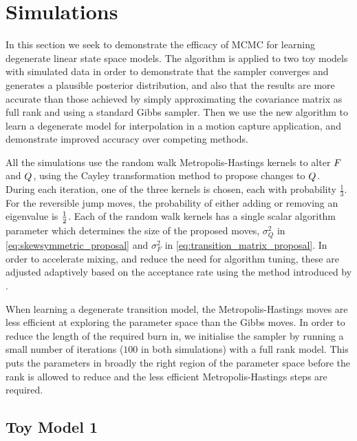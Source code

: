 \documentclass[journal,10pt]{IEEEtran}
\begin{document}
\section{Simulations} \label{sec:simulations}

In this section we seek to demonstrate the efficacy of MCMC for learning degenerate linear state space models. The algorithm is applied to two toy models with simulated data in order to demonstrate that the sampler converges and generates a plausible posterior distribution, and also that the results are more accurate than those achieved by simply approximating the covariance matrix as full rank and using a standard Gibbs sampler. Then we use the new algorithm to learn a degenerate model for interpolation in a motion capture application, and demonstrate improved accuracy over competing methods.

All the simulations use the random walk Metropolis-Hastings kernels to alter $F_{}$ and $Q_{}$, using the Cayley transformation method to propose changes to $Q_{}$. During each iteration, one of the three kernels is chosen, each with probability $\frac{1}{3}$. For the reversible jump moves, the probability of either adding or removing an eigenvalue is $\frac{1}{2}$. Each of the random walk kernels has a single scalar algorithm parameter which determines the size of the proposed moves, $\sigma_Q^2$ in \eqref{eq:skewsymmetric_proposal} and $\sigma_F^2$ in \eqref{eq:transition_matrix_proposal}. In order to accelerate mixing, and reduce the need for algorithm tuning, these are adjusted adaptively based on the acceptance rate using the method introduced by \cite{Roberts2009}.

When learning a degenerate transition model, the Metropolis-Hastings moves are less efficient at exploring the parameter space than the Gibbs moves. In order to reduce the length of the required burn in, we initialise the sampler by running a small number of iterations ($100$ in both simulations) with a full rank model. This puts the parameters in broadly the right region of the parameter space before the rank is allowed to reduce and the less efficient Metropolis-Hastings steps are required.



\subsection{Toy Model 1}
\end{document}
